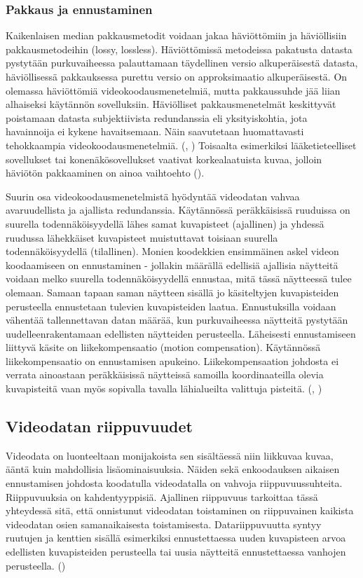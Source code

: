 \subsubsection{Pakkaus ja ennustaminen}

Kaikenlaisen median pakkausmetodit voidaan jakaa häviöttömiin
ja häviöllisiin pakkausmetodeihin (lossy, lossless). Häviöttömissä metodeissa pakatusta datasta
pystytään purkuvaiheessa palauttamaan täydellinen versio alkuperäisestä
datasta, häviöllisessä pakkauksessa purettu versio on approksimaatio
alkuperäisestä. On olemassa häviöttömiä videokoodausmenetelmiä, mutta
pakkaussuhde jää liian alhaiseksi käytännön sovelluksiin. Häviölliset
pakkausmenetelmät keskittyvät poistamaan datasta subjektiivista redundanssia
eli yksityiskohtia, jota havainnoija ei kykene havaitsemaan. Näin
saavutetaan huomattavasti tehokkaampia videokoodausmenetelmiä. (\citealt{h264}, \citealt{du})
Toisaalta esimerkiksi lääketieteelliset sovellukset tai konenäkösovellukset
vaativat korkealaatuista kuvaa, jolloin häviötön pakkaaminen on ainoa
vaihtoehto (\citealt{xu}).

Suurin osa videokoodausmenetelmistä hyödyntää videodatan vahvaa
avaruudellista ja ajallista redundanssia. Käytännössä peräkkäisissä
ruuduissa on suurella todennäköisyydellä lähes samat kuvapisteet (ajallinen) ja
yhdessä ruudussa lähekkäiset kuvapisteet muistuttavat toisiaan suurella
todennäköisyydellä (tilallinen). Monien koodekkien ensimmäinen askel videon koodaamiseen
on ennustaminen - jollakin määrällä edellisiä ajallisia näytteitä voidaan
melko suurella todennäköisyydellä ennustaa, mitä tässä näytteessä tulee
olemaan. Samaan tapaan saman näytteen sisällä jo käsiteltyjen kuvapisteiden
perusteella ennustetaan tulevien kuvapisteiden laatua. Ennustuksilla voidaan
vähentää tallennettavan datan määrää, kun purkuvaiheessa näytteitä pystytään
uudelleenrakentamaan edellisten näytteiden perusteella. Läheisesti
ennustamiseen liittyvä käsite on liikekompensaatio (motion compensation).
Käytännössä liikekompensaatio on ennustamisen apukeino. Liikekompensaation
johdosta ei verrata
ainoastaan peräkkäisissä näytteissä samoilla koordinaateilla
olevia kuvapisteitä vaan myös sopivalla tavalla lähialueilta valittuja
pisteitä. (\citealt{h264}, \citealt{du})

\subsection{Videodatan riippuvuudet}
\label{sec:depend}

Videodata on luonteeltaan monijakoista sen sisältäessä niin liikkuvaa kuvaa,
ääntä kuin mahdollisia lisäominaisuuksia. Näiden sekä
enkoodauksen aikaisen ennustamisen johdosta koodatulla videodatalla on vahvoja
riippuvuussuhteita. Riippuvuuksia on kahdentyyppisiä. Ajallinen riippuvuus
tarkoittaa tässä yhteydessä sitä, että onnistunut videodatan
toistaminen on riippuvainen kaikista videodatan osien samanaikaisesta
toistamisesta. Datariippuvuutta syntyy ruutujen ja kenttien
sisällä esimerkiksi ennustettaessa uuden kuvapisteen arvoa edellisten
kuvapisteiden perusteella tai uusia näytteitä ennustettaessa  vanhojen
perusteella. (\citealt{mujal})

